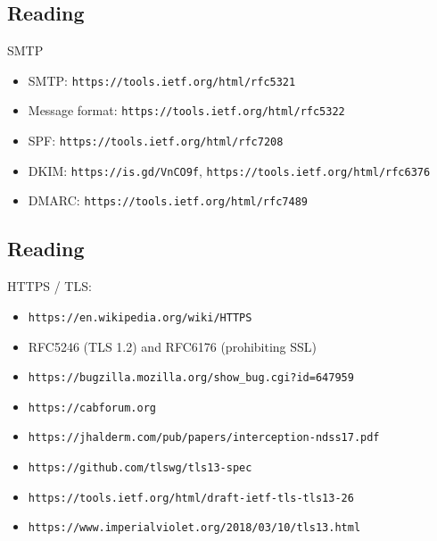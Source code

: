 \documentclass[xga]{xdvislides}
\begin{document}
\subsection{Reading}
SMTP
\begin{itemize}
	\item SMTP: {\tt https://tools.ietf.org/html/rfc5321}
	\item Message format: {\tt https://tools.ietf.org/html/rfc5322}
	\item SPF: {\tt https://tools.ietf.org/html/rfc7208}
	\item DKIM: {\tt https://is.gd/VnCO9f}, {\tt https://tools.ietf.org/html/rfc6376}
	\item DMARC: {\tt https://tools.ietf.org/html/rfc7489}
\end{itemize}

\subsection{Reading}
HTTPS / TLS:
\begin{itemize}
	\item {\tt https://en.wikipedia.org/wiki/HTTPS}
	\item RFC5246 (TLS 1.2) and RFC6176 (prohibiting SSL)
	\item {\tt https://bugzilla.mozilla.org/show\_bug.cgi?id=647959}
	\item {\tt https://cabforum.org}
	\item {\tt https://jhalderm.com/pub/papers/interception-ndss17.pdf}
	\item {\tt https://github.com/tlswg/tls13-spec}
	\item {\tt https://tools.ietf.org/html/draft-ietf-tls-tls13-26}
	\item {\tt https://www.imperialviolet.org/2018/03/10/tls13.html}
\end{itemize}
\end{document}
